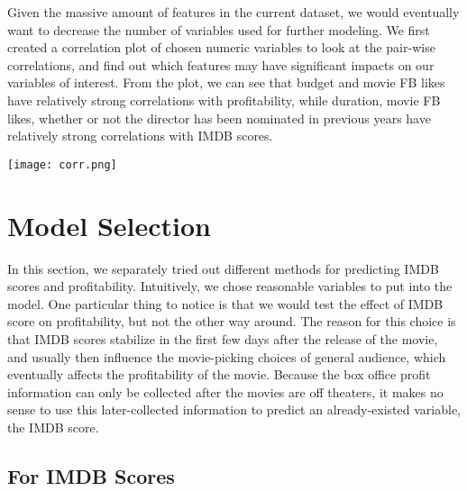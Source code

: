\documentclass[12pt]{article}
\begin{document}
\par
Given the massive amount of features in the current dataset, we would eventually want to decrease the number of variables used for further modeling. We first created a correlation plot of chosen numeric variables to look at the pair-wise correlations, and find out which features may have significant impacts on our variables of interest. From the plot, we can see that budget and movie FB likes have relatively strong correlations with profitability, while duration, movie FB likes, whether or not the director has been nominated in previous years have relatively strong correlations with IMDB scores.  
\begin{center}
\texttt{[image: corr.png]}\\
\end{center}

\section{Model Selection}
In this section, we separately tried out different methods for predicting IMDB scores and profitability. Intuitively, we chose reasonable variables to put into the model. One particular thing to notice is that we would test the effect of IMDB score on profitability, but not the other way around. The reason for this choice is that IMDB scores stabilize in the first few days after the release of the movie, and usually then influence the movie-picking choices of general audience, which eventually affects the profitability of the movie. Because the box office profit information can only be collected after the movies are off theaters, it makes no sense to use this later-collected information to predict  an already-existed variable, the IMDB score. 

\subsection{For IMDB Scores}
\end{document}
